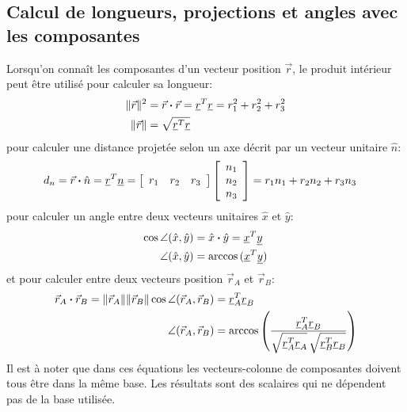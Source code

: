 \subsection{Calcul de longueurs, projections et angles avec les composantes}
Lorsqu'on connaît les composantes d'un vecteur position $\vec{r}$, le produit intérieur peut être utilisé pour calculer sa longueur:
\begin{align}
	\|\vec{r}\|^2 &= \vec{r} \boldsymbol{\cdot} \vec{r} = \underline{r}^T \underline{r} = r_1^2 + r_2^2 + r_3^2  \\
	\|\vec{r}\|  &= \sqrt{ \underline{r}^T \underline{r} }
\end{align}
pour calculer une distance projetée selon un axe décrit par un vecteur unitaire $\hat{n}$:
\begin{align}
	d_n &= \vec{r} \boldsymbol{\cdot} \hat{n} = \underline{r}^T \underline{n} =
	\left[ \begin{array}{c c c} r_1 &  r_2 &  r_3  \end{array} \right]
	\left[ \begin{array}{c}     n_1 \\ n_2 \\ n_3  \end{array} \right]
	= r_1 n_1 + r_2 n_2 + r_3 n_3
\end{align}
pour calculer un angle entre deux vecteurs unitaires $\hat{x}$ et $\hat{y}$:
\begin{align}
	\cos \angle (\hat{x},\hat{y}) &= \hat{x} \boldsymbol{\cdot} \hat{y} = \underline{x}^T \underline{y} \\
	\angle (\hat{x},\hat{y}) &= \arccos{ ( \underline{x}^T \underline{y} ) }
\end{align}
et pour calculer entre deux vecteurs position $\vec{r}_A$ et $\vec{r}_B$:
\begin{align}
	\vec{r}_A \boldsymbol{\cdot} \vec{r}_B = \|\vec{r}_A\|  \|\vec{r}_B\|  \cos \angle (\vec{r}_A,\vec{r}_B) &= \underline{r}_A^T \underline{r}_B \\
	\angle (\vec{r}_A,\vec{r}_B) &= \arccos{ \left( \frac{\underline{r}_A^T \underline{r}_B }{ \sqrt{ \underline{r}_A^T \underline{r}_A} \, \sqrt{ \underline{r}_B^T \underline{r}_B}} \right) }
\end{align}
%
Il est à noter que dans ces équations les vecteurs-colonne de composantes doivent tous être dans la même base. Les résultats sont des scalaires qui ne dépendent pas de la base utilisée.

